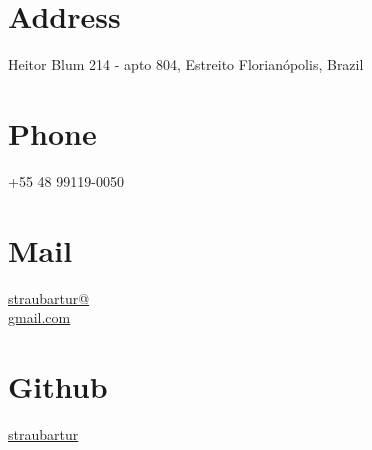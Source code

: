 \documentclass{friggeri-cv}
\begin{document}
      

\begin{aside}
  \section{Address}
    Heitor Blum
    214 - apto 804, Estreito
    Florianópolis, Brazil
    ~
  \section{Phone}
    +55 48 99119-0050
    ~
  \section{Mail}
    \href{mailto:straubartur@gmail.com}{straubartur@\\gmail.com}
    ~
  \section{Github}
    \href{https://github.com/straubartur}{straubartur}
    ~

\end{aside}
\end{document}
